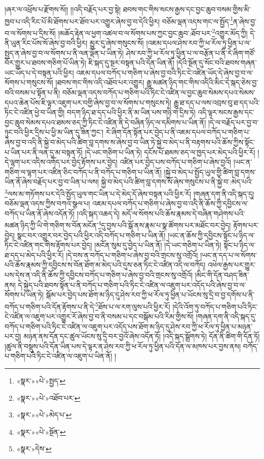 །ཞར་ལ་འཕྲོས་པ་རྫོགས་སོ།། །།འདི་བརྗོད་པར་བྱ་སྟེ། ཐབས་གང་གིས་སངས་རྒྱས་དང་བྱང་ཆུབ་བསམ་གྱིས་མི་ཁྱབ་པ་འདི་རིང་པོ་མི་ཐོགས་པར་ཐོབ་པར་འགྱུར་ཞེས་བྱ་བ་དེའི་ཕྱིར། བཅོམ་ལྡན་འདས་གང་ལ་སྤྱོད་\footnote{«སྣར་»«པེ་»སྤྱད་}ན་ཞེས་བྱ་བ་ལ་སོགས་པ་དྲིས་སོ། །མཆོད་རྟེན་ལ་ཕྱག་འཚལ་བ་ལ་སོགས་པས་ཀྱང་བྱང་ཆུབ་:ཐོབ་པར་\footnote{«སྣར་»«པེ་»འཐོབ་པར་}འགྱུར་མོད་ཀྱི། དེ་ནི་ཡུན་རིང་པོས་སོ་ཞེས་བྱ་བའི་ཕྱིར། མྱུར་དུ་ཞེས་གསུངས་སོ། །འཇམ་དཔལ་ཤེས་རབ་ཀྱི་ཕ་རོལ་ཏུ་ཕྱིན་པ་ལ་སྤྱད་ན་ཞེས་བྱ་བ་ལ་སོགས་པ་ནི་ལན་ལྡོན་པ་ཡིན་ཏེ། ཤེས་རབ་ཀྱི་ཕ་རོལ་ཏུ་ཕྱིན་པ་ལ་བརྩོན་པ་ནི་རེ་ཞིག་གཙོ་བོར་གྱུར་པ་ཐབས་གཅིག་པོ་ཡིན་ཏེ། ཇི་སྐད་དུ་སྔར་བསྟན་པའི་དོན་ཡིན་ནོ། །དེའི་སྔོན་དུ་སོང་བའི་ཐབས་གཞན་ཡང་ཡོད་པ་དེ་བསྟན་པའི་ཕྱིར། འཇམ་དཔལ་བཀོད་པ་གཅིག་པ་ཞེས་བྱ་བའི་ཏིང་ངེ་འཛིན་ཡོད་དེ་ཞེས་བྱ་བ་ལ་སོགས་པ་གསུངས་སོ། །ཐབས་གང་གིས་འདི་འཐོབ་པར་འགྱུར། རྒྱུ་མཚན་ཉིད་གང་གིས་འདིའི་མིང་དེ་སྐད་ཅེས་བྱ་བའི་བསམ་པ་སྟོན་པ་ནི། བཅོམ་ལྡན་འདས་བཀོད་པ་གཅིག་པའི་ཏིང་ངེ་འཛིན་ལ་བྱང་ཆུབ་སེམས་དཔའ་སེམས་དཔའ་ཆེན་པོས་ཇི་ལྟར་འཇུག་པར་བགྱི་ཞེས་བྱ་བ་ལ་སོགས་པ་གསུངས་ཏེ། རྒྱུ་ཐ་དད་པ་ལས་འབྲས་བུ་ཐ་དད་པའི་ཏིང་ངེ་འཛིན་ཕྱེ་བ་ཡིན་གྱི། བདག་ཉིད་ཐ་དད་པའི་ཕྱིར་ནི་མ་ཡིན་པས་གཉི་ག་དྲིས་ཏེ། འདི་ལྟར་སངས་རྒྱས་དང་བྱང་ཆུབ་སེམས་དཔའ་ཐམས་ཅད་ཀྱི་ཏིང་ངེ་འཛིན་ནི་དེ་བཞིན་ཉིད་ལ་དམིགས་པ་ཡིན་ནོ། །དེ་ལ་བརྗོད་པར་བྱ་བ་ཉུང་བའི་ཕྱིར་དྲིས་པ་ཕྱི་མ་ཡིན་དུ་ཟིན་ཀྱང་། རེ་ཞིག་དོན་སྟོན་པར་བྱེད་པ་ནི་འཇམ་དཔལ་བཀོད་པ་གཅིག་པ་ཞེས་བྱ་བ་འདི་ནི་སྐྱེ་བ་མེད་པའི་ཚིག་བླ་དགས་ས་ཞེས་བྱ་བ་ཡིན་ཏེ་སྐྱེ་བ་མེད་པ་ནི་བརྟགས་པའི་ཆོས་ཀྱིས་སྟོང་པ་ཡིན་པར་ནི་ལན་དུ་མ་བསྟན་ཏོ། །དེ་ཡང་གཅིག་པ་ཡིན་ཏེ། དངོས་པོ་ཐམས་ཅད་ལ་ཁྱད་པར་མེད་པའི་ཕྱིར་རོ། །དེ་ལྷག་པར་འདིས་འགོད་པར་བྱེད་རྟོགས་པར་བྱེད། འཛིན་པར་བྱེད་པས་བཀོད་པ་གཅིག་པ་ཞེས་བྱའོ། །ཡང་ན་གཅིག་ལ་ལྷག་པར་འཛིན་ཅིང་བཀོད་པ་ནི་བཀོད་པ་གཅིག་པ་ཡིན་ནོ། །སྐྱེ་བ་མེད་པ་སྤྱོད་ཡུལ་གྱི་ཚིག་བླ་དགས་ཡིན་ནོ་ཞེས་བརྗོད་པར་བྱ་བ་ཡིན་པ་ལས། སྐྱེ་བ་མེད་པའི་ཚིག་བླ་དགས་སོ་ཞེས་གསུངས་པ་ནི་སྐྱེ་བ་:མེད་པའི་\footnote{«སྣར་»«པེ་»མེད་པ་}ལས་མ་གཏོགས་པར་དེའི་སྤྱོད་ཡུལ་གང་ཡིན་པ་དེ་མེད་དོ་ཞེས་བསྟན་པའི་ཕྱིར་རོ། །གཞན་དག་ནི་འདི་སྐད་དུ། བཅོམ་ལྡན་འདས་ཀྱིས་བཀའ་སྩལ་པ། འཇམ་དཔལ་བཀོད་པ་གཅིག་པ་ཞེས་བྱ་བ་འདི་ནི་ཆོས་ཀྱི་དབྱིངས་ལ་བཀོད་པ་ཡིན་ནོ་ཞེས་འདོན་ཏོ། །འདི་སྐད་འཆད་དེ། མདོ་ལ་སོགས་པའི་ཆོས་རྣམས་དེ་བཞིན་གཤེགས་པའི་མཚན་ཉིད་ཀྱི་ཡི་གེ་གཅིག་ས་བོན་མངོན་\footnote{«སྣར་»«པེ་»སྔོན་}དུ་བྱས་པའི་སྒོ་ནས་རྣམ་པ་སྣ་ཚོགས་པར་མཐོང་བར་བྱེད། རྟོགས་པར་བྱེད། སྣང་བར་འགྱུར་བར་བྱེད་པའི་ཕྱིར་འདི་བཀོད་པ་གཅིག་པ་ཡིན་ནོ། །ཡང་ན་ཆོས་ཀྱི་དབྱིངས་སྟོང་པ་ཉིད་ལ་ཏིང་ངེ་འཛིན་གང་གིས་རྟོགས་པར་བྱེད། །མངོན་སུམ་དུ་བྱེད་པ་ཡིན་ནོ། །དེ་ཡང་གཅིག་པ་ཡིན་ཏེ། སྟོང་པ་ཉིད་ལ་ཐ་དད་པ་མེད་པའི་ཕྱིར་རོ། །དེ་བས་ན་བཀོད་པ་གཅིག་པ་ཞེས་བྱ་བའི་གྲངས་སུ་འགྲོའོ། །ཡང་ན་དད་པ་ལ་སོགས་པའི་ཆོས་རྣམས་ཀྱི་དབྱིངས་ས་བོན་ཐོག་མ་མེད་པའི་དུས་ཅན་ཏིང་ངེ་འཛིན་འདི་ལ་བཀོད། འཕེལ་རྒྱས་པར་གྱུར་པས་དེས་ན་འདི་ནི་ཆོས་ཀྱི་དབྱིངས་བཀོད་པ་གཅིག་པ་ཞེས་བྱ་བའི་གྲངས་སུ་འགྲོའོ། །མིང་གི་དོན་བཤད་ཟིན་ནས། དེ་སྐྱེད་པའི་ཐབས་སྟོན་པ་ནི་བཀོད་པ་གཅིག་པའི་ཏིང་ངེ་འཛིན་ལ་འཇུག་པར་འདོད་པའི་ཞེས་བྱ་བ་ལ་སོགས་པ་ཡིན་ཏེ། སྒོམ་པར་བྱེད་པས་ཐོག་མ་ཉིད་དུ་ཤེས་རབ་ཀྱི་ཕ་རོལ་ཏུ་ཕྱིན་པ་ཡོངས་སུ་དྲི་བ་བྱ་དགོས་པ་ནི་བཀོད་པ་གཅིག་པའི་དོན་རྟོགས་པ་ནི་དེ་\footnote{«སྣར་»དེས་}ཐོས་པ་ལ་རག་ལུས་པའི་ཕྱིར་རོ། །དེའི་འོག་ཏུ་བཀོད་པ་གཅིག་པའི་ཏིང་ངེ་འཛིན་ལ་འཇུག་པར་འགྱུར་རོ་ཞེས་བྱ་བ་ནི་བསམ་པ་དང་བསྒོམ་པའི་རིམ་གྱིས་སོ། །གཞན་དག་ནི་འདི་སྐད་དུ་བཀོད་པ་གཅིག་པའི་ཏིང་ངེ་འཛིན་ལ་འཇུག་པར་འདོད་པས་ཐོག་མ་ཉིད་དུ་ཤེས་རབ་ཀྱི་ཕ་རོལ་ཏུ་ཕྱིན་པ་མཉན་པར་བྱ། མཉན་ནས་དོན་དང་ཚུལ་ཡོངས་སུ་དྲི་བར་བྱའོ་ཞེས་འདོན་ཏོ། །འདི་སྐད་སྒྲོགས་ཏེ། དོན་ནི་ཚིག་གི་དོན་ཏོ། །ཚུལ་ནི་བསྡུས་པའི་དོན་ཡིན་པས་དེ་ལྟར་ན་ཤེས་རབ་ཀྱི་ཕ་རོལ་ཏུ་ཕྱིན་པའི་དོན་ལ་མཁས་པར་བྱས་ནས། བཀོད་པ་གཅིག་པའི་ཏིང་ངེ་འཛིན་ལ་འཇུག་པ་ཡིན་ནོ། །
